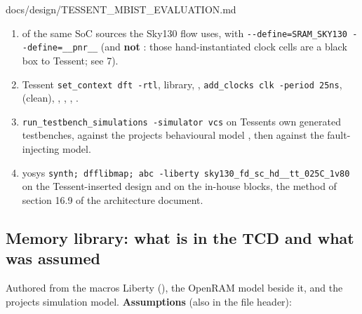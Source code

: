 \begin{relocated}{docs/design/TESSENT_MBIST_EVALUATION.md}
\begin{enumerate}
\def\labelenumi{\arabic{enumi}.}
\tightlist
\item
   of the same SoC sources the Sky130 flow uses, with
  \texttt{-\allowbreak{}-\allowbreak{}define=\allowbreak{}SRAM\_\allowbreak{}SKY130\ -\allowbreak{}-\allowbreak{}define=\allowbreak{}\_\allowbreak{}\_\allowbreak{}pnr\_\allowbreak{}\_\allowbreak{}}
  (and \textbf{not} : those hand-instantiated
  clock cells are a black box to Tessent; see 7).
\item
  Tessent \texttt{set\_\allowbreak{}context\ dft\ -\allowbreak{}rtl},
   library, ,
  \texttt{add\_\allowbreak{}clocks\ clk\ -\allowbreak{}period\ 25ns},
   (clean), ,
  , ,
  .
\item
  \texttt{run\_\allowbreak{}testbench\_\allowbreak{}simulations\ -\allowbreak{}simulator\ vcs}
  on Tessent\textquotesingle s own generated testbenches, against the
  project\textquotesingle s behavioural model
  , then against the
  fault-injecting model.
\item
  yosys
  \texttt{synth;\ dfflibmap;\ abc\ -\allowbreak{}liberty\ sky130\_\allowbreak{}fd\_\allowbreak{}sc\_\allowbreak{}hd\_\allowbreak{}\_\allowbreak{}tt\_\allowbreak{}025C\_\allowbreak{}1v80}
  on the Tessent-inserted design and on the in-house blocks, the method
  of section 16.9 of the architecture document.
\end{enumerate}

\subsection{Memory library: what is in the TCD and what was assumed}\label{tm:dec:tessent-mbist-evaluation:2-memory-library-what-is-in-the-tcd-and-what-was-assumed}

Authored from the macro\textquotesingle s Liberty
(), the OpenRAM model
beside it, and the project\textquotesingle s simulation model.
\textbf{Assumptions} (also in the file header):

{\footnotesize\setlength{\tabcolsep}{3pt}

}
\end{relocated}
